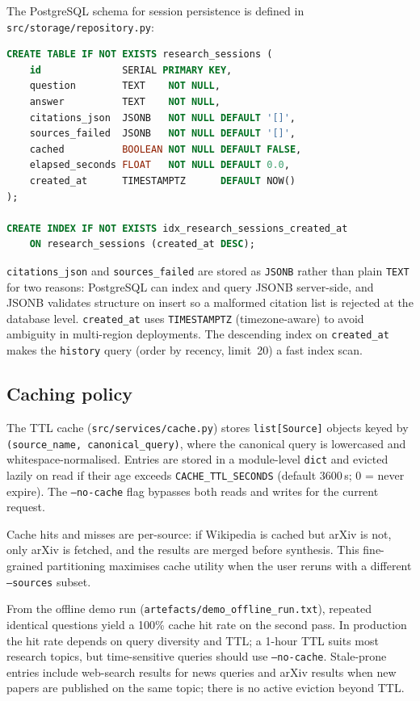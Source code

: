 \documentclass[11pt,a4paper]{article}
\begin{document}
The PostgreSQL schema for session persistence is defined in
\texttt{src/storage/repository.py}:

\begin{lstlisting}[style=python, language=sql, numbers=none,
  basicstyle=\ttfamily\small,
  caption={PostgreSQL schema for \texttt{research\_sessions}}]
CREATE TABLE IF NOT EXISTS research_sessions (
    id              SERIAL PRIMARY KEY,
    question        TEXT    NOT NULL,
    answer          TEXT    NOT NULL,
    citations_json  JSONB   NOT NULL DEFAULT '[]',
    sources_failed  JSONB   NOT NULL DEFAULT '[]',
    cached          BOOLEAN NOT NULL DEFAULT FALSE,
    elapsed_seconds FLOAT   NOT NULL DEFAULT 0.0,
    created_at      TIMESTAMPTZ      DEFAULT NOW()
);

CREATE INDEX IF NOT EXISTS idx_research_sessions_created_at
    ON research_sessions (created_at DESC);
\end{lstlisting}

\texttt{citations\_json} and \texttt{sources\_failed} are stored as \texttt{JSONB}
rather than plain \texttt{TEXT} for two reasons: PostgreSQL can index and query JSONB
server-side, and JSONB validates structure on insert so a malformed citation list is
rejected at the database level. \texttt{created\_at} uses \texttt{TIMESTAMPTZ}
(timezone-aware) to avoid ambiguity in multi-region deployments. The descending index
on \texttt{created\_at} makes the \texttt{history} query (order by recency, limit~20)
a fast index scan.

\subsection{Caching policy}

The TTL cache (\texttt{src/services/cache.py}) stores \texttt{list[Source]} objects
keyed by \texttt{(source\_name, canonical\_query)}, where the canonical query is
lowercased and whitespace-normalised. Entries are stored in a module-level \texttt{dict}
and evicted lazily on read if their age exceeds \texttt{CACHE\_TTL\_SECONDS}
(default 3600\,s; 0 = never expire). The \texttt{--no-cache} flag bypasses both reads
and writes for the current request.

Cache hits and misses are per-source: if Wikipedia is cached but arXiv is not, only
arXiv is fetched, and the results are merged before synthesis. This fine-grained
partitioning maximises cache utility when the user reruns with a different
\texttt{--sources} subset.

From the offline demo run (\texttt{artefacts/demo\_offline\_run.txt}), repeated
identical questions yield a 100\% cache hit rate on the second pass. In production the
hit rate depends on query diversity and TTL; a 1-hour TTL suits most research topics,
but time-sensitive queries should use \texttt{--no-cache}. Stale-prone entries include
web-search results for news queries and arXiv results when new papers are published
on the same topic; there is no active eviction beyond TTL.
\end{document}
